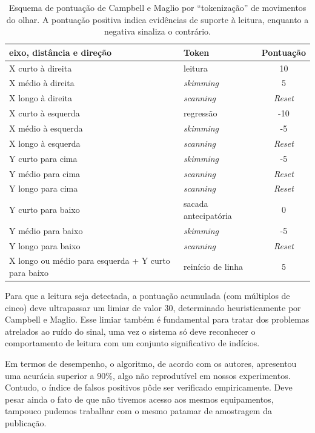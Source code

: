 \documentclass[12pt]{article}
\begin{document}
		\begin{table}[!h]
			\renewcommand{\arraystretch}{0.8}
			\begin{center}
				\begin{tabular}{|p{6cm}|l|c|}  \hline
					\textbf{eixo, distância e direção} & \textbf{Token} & \textbf{Pontuação}\\\hline
					X curto à direita  & leitura   & 10  \\
					X médio à direita  & \textit{skimming}  & 5  \\
					X longo à direita  & \textit{scanning}  & \textit{Reset} \\
					X curto à esquerda & regressão & -10 \\
					X médio à esquerda & \textit{skimming}  & -5  \\
					X longo à esquerda & \textit{scanning}  & \textit{Reset}  \\
					Y curto para cima  & \textit{skimming}  & -5 \\
					Y médio para cima  & \textit{scanning}  & \textit{Reset} \\
					Y longo para cima  & \textit{scanning}  & \textit{Reset}  \\
					Y curto para baixo & sacada antecipatória & 0  \\
					Y médio para baixo & \textit{skimming} & -5\\
					Y longo para baixo & \textit{scanning} & \textit{Reset}\\
					X longo ou médio para esquerda + Y curto para baixo & reinício de linha & 5\\\hline
					
				\end{tabular}
			\end{center}
			\label{tab:campbell_tab}
			\caption{\footnotesize{Esquema de pontuação de Campbell e Maglio por ``tokenização'' de movimentos do olhar. A pontuação positiva indica evidências de suporte à leitura, enquanto a negativa sinaliza o contrário.}}
		\end{table}
		
		Para que a leitura seja detectada, a pontuação acumulada (com múltiplos de cinco) deve ultrapassar um limiar de valor 30, determinado heuristicamente por Campbell e Maglio. Esse limiar também é fundamental para tratar dos problemas atrelados ao ruído do sinal, uma vez o sistema só deve reconhecer o comportamento de leitura com um conjunto significativo de indícios.		
		
		Em termos de desempenho, o algoritmo, de acordo com os autores, apresentou uma acurácia superior a 90\%, algo não reprodutível em nossos experimentos. Contudo, o índice de falsos positivos pôde ser verificado empiricamente. Deve pesar ainda o fato de que não tivemos acesso aos mesmos equipamentos, tampouco pudemos trabalhar com o mesmo patamar de amostragem da publicação.
		
\end{document}
